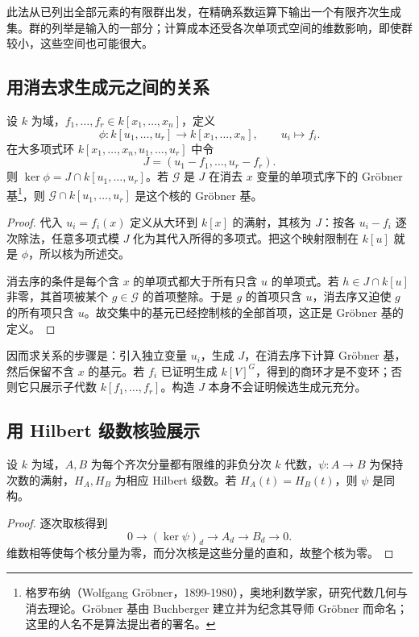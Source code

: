 \ProseParagraphBreak
此法从已列出全部元素的有限群出发，在精确系数运算下输出一个有限齐次生成集。群的列举是输入的一部分；计算成本还受各次单项式空间的维数影响，即使群较小，这些空间也可能很大。

\subsection{用消去求生成元之间的关系}
\label{b5:subsec:2204:02}

\begin{proposition}\label{b5:prop:invariant-elimination-presentation}
	设 \(k\) 为域，\(f_1,\ldots,f_r\in k[x_1,\ldots,x_n]\)，定义
	\[
		\phi:k[u_1,\ldots,u_r]\longrightarrow k[x_1,\ldots,x_n], \qquad u_i\longmapsto f_i.
	\]
	在大多项式环 \(k[x_1,\ldots,x_n,u_1,\ldots,u_r]\) 中令
	\[
		J=(u_1-f_1,\ldots,u_r-f_r).
	\]
	则 \(\ker\phi=J\cap k[u_1,\ldots,u_r]\)。若 \(\mathcal G\) 是 \(J\) 在消去 \(x\) 变量的单项式序下的 Gröbner 基\footnote{格罗布纳（Wolfgang Gröbner，1899-1980），奥地利数学家，研究代数几何与消去理论。Gröbner 基由 Buchberger 建立并为纪念其导师 Gröbner 而命名；这里的人名不是算法提出者的署名。}，则 \(\mathcal G\cap k[u_1,\ldots,u_r]\) 是这个核的 Gröbner 基。
\end{proposition}
\begin{proof}
	代入 \(u_i=f_i(x)\) 定义从大环到 \(k[x]\) 的满射，其核为 \(J\)：按各 \(u_i-f_i\) 逐次除法，任意多项式模 \(J\) 化为其代入所得的多项式。把这个映射限制在 \(k[u]\) 就是 \(\phi\)，所以核为所述交。

	消去序的条件是每个含 \(x\) 的单项式都大于所有只含 \(u\) 的单项式。若 \(h\in J\cap k[u]\) 非零，其首项被某个 \(g\in\mathcal G\) 的首项整除。于是 \(g\) 的首项只含 \(u\)，消去序又迫使 \(g\) 的所有项只含 \(u\)。故交集中的基元已经控制核的全部首项，这正是 Gröbner 基的定义。
\end{proof}

因而求关系的步骤是：引入独立变量 \(u_i\)，生成 \(J\)，在消去序下计算 Gröbner 基，然后保留不含 \(x\) 的基元。若 \(f_i\) 已证明生成 \(k[V]^G\)，得到的商环才是不变环；否则它只展示子代数 \(k[f_1,\ldots,f_r]\)。构造 \(J\) 本身不会证明候选生成元充分。

\subsection{用 Hilbert 级数核验展示}
\label{b5:subsec:2204:03}

\begin{lemma}\label{b5:lem:hilbert-surjection-test}
	设 \(k\) 为域，\(A,B\) 为每个齐次分量都有限维的非负分次 \(k\) 代数，\(\psi:A\to B\) 为保持次数的满射，\(H_A,H_B\) 为相应 Hilbert 级数。若 \(H_A(t)=H_B(t)\)，则 \(\psi\) 是同构。
\end{lemma}
\begin{proof}
	逐次取核得到
	\[
		0\longrightarrow(\ker\psi)_d\longrightarrow A_d\longrightarrow B_d\longrightarrow0.
	\]
	维数相等使每个核分量为零，而分次核是这些分量的直和，故整个核为零。
\end{proof}

